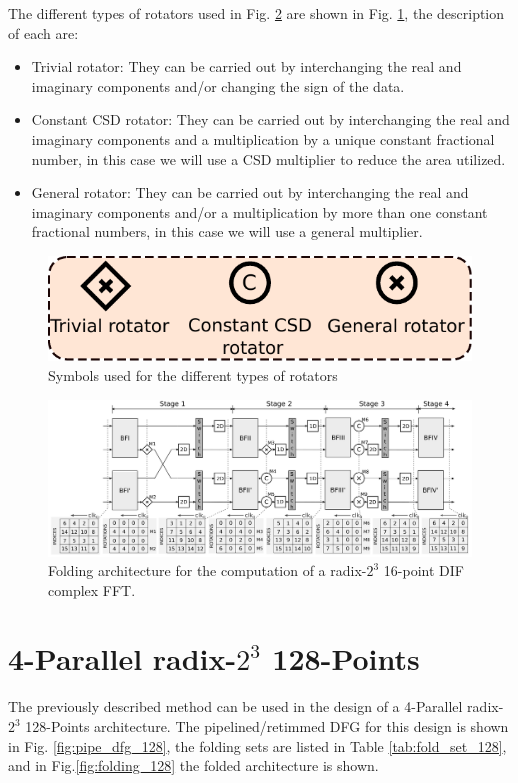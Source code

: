 \documentclass[journal,comsoc]{IEEEtran}
\begin{document}
The different types of rotators used in Fig. \ref{fig:folding_16_arch} are shown in Fig. \ref{fig:rotators}, the description of each are:
\begin{itemize}
	\item Trivial rotator: They can be carried out by interchanging the real and imaginary components and/or changing the sign of the data.
	\item Constant CSD rotator: They can be carried out by interchanging the real and imaginary components and a multiplication by a unique constant fractional number, in this case we will use a CSD multiplier to reduce the area utilized.
	\item General rotator: They can be carried out by interchanging the real and imaginary components and/or a multiplication by more than one constant fractional numbers, in this case we will use a general multiplier.
\end{itemize}

\begin{figure} 
	\centering
	\includegraphics[width=0.6\linewidth]{Diagramas/miSeccionFiguras/Rotadores.pdf}
	\caption{Symbols used for the different types of rotators}
	\label{fig:rotators}
\end{figure}


\begin{figure} 
	\centering
	\includegraphics[width=0.85\linewidth]{Diagramas/folding-16.png}
	\caption{Folding architecture for the computation of a radix-$2^3$ 16-point DIF complex FFT.}
	\label{fig:folding_16_arch}
\end{figure}



\section{4-Parallel radix-$2^3$ 128-Points}   \label{sec:imp128}
The previously described method can be used in the design of a 4-Parallel radix-$2^3$ 128-Points architecture. 
The pipelined/retimmed  DFG for this design is shown in Fig. \ref{fig:pipe_dfg_128}, the folding sets are listed in Table \ref{tab:fold_set_128}, and in Fig.\ref{fig:folding_128}  the folded architecture is shown.
\end{document}
